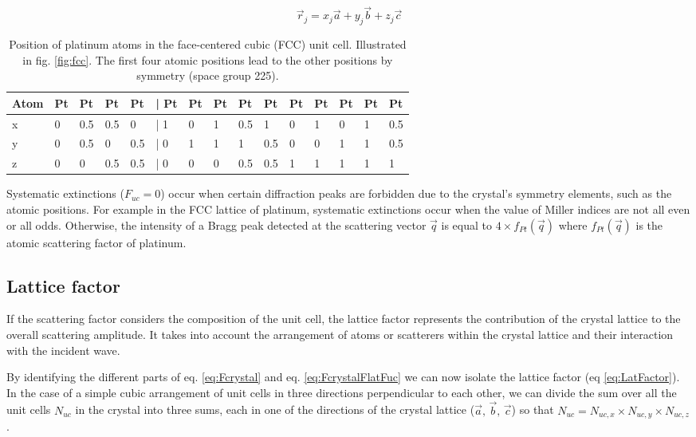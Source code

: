 \begin{equation}
    \label{eq:AtomPos}
    \vec{r}_j = x_j\vec{a} + y_j\vec{b} + z_j\vec{c}
\end{equation}

\begin{table}[!htb]
    \centering
    \begin{tabular}{@{}lllllllllllllll@{}}
    \toprule
    Atom & Pt & Pt  & Pt  & Pt  & | Pt & Pt & Pt & Pt  & Pt  & Pt & Pt & Pt & Pt & Pt  \\ \midrule
    x    & 0  & 0.5 & 0.5 & 0   & | 1  & 0  & 1  & 0.5 & 1   & 0  & 1  & 0  & 1  & 0.5 \\
    y    & 0  & 0.5 & 0   & 0.5 & | 0  & 1  & 1  & 1   & 0.5 & 0  & 0  & 1  & 1  & 0.5 \\
    z    & 0  & 0   & 0.5 & 0.5 & | 0  & 0  & 0  & 0.5 & 0.5 & 1  & 1  & 1  & 1  & 1   \\ \bottomrule
    \end{tabular}
    \caption{Position of platinum atoms in the face-centered cubic (FCC) unit cell. Illustrated in fig. \ref{fig:fcc}. The first four atomic positions  lead to the other positions by symmetry (space group 225).}
    \label{tab:PtAtoms}
\end{table}

Systematic extinctions ($F_{uc} = 0$) occur when certain diffraction peaks are forbidden due to the crystal's symmetry elements, such as the atomic positions.
For example in the FCC lattice of platinum, systematic extinctions occur when the value of Miller indices are not all even or all odds.
Otherwise, the intensity of a Bragg peak detected at the scattering vector $\vec{q}$ is equal to $4\times f_{Pt}(\vec{q})$ where $f_{Pt}(\vec{q})$ is the atomic scattering factor of platinum.

\subsection{Lattice factor} \label{sec:LatticeFactor}

If the scattering factor considers the composition of the unit cell, the lattice factor represents the contribution of the crystal lattice to the overall scattering amplitude.
It takes into account the arrangement of atoms or scatterers within the crystal lattice and their interaction with the incident wave.

By identifying the different parts of eq. \ref{eq:Fcrystal} and eq. \ref{eq:FcrystalFlatFuc} we can now isolate the lattice factor (eq \ref{eq:LatFactor}).
In the case of a simple cubic arrangement of unit cells in three directions perpendicular to each other, we can divide the sum over all the unit cells $N_{uc}$ in the crystal into three sums, each in one of the directions of the crystal lattice ($\vec{a}, \, \vec{b}, \, \vec{c}$) so that $N_{uc} = N_{uc, x} \times N_{uc, y} \times N_{uc, z}$.

